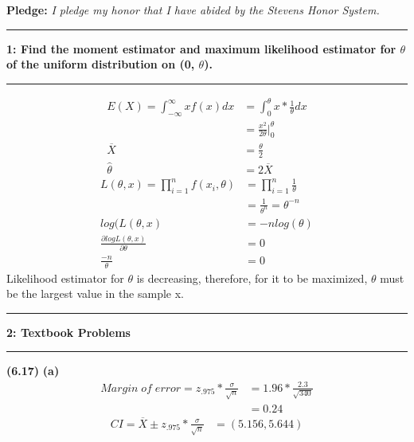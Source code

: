 \documentclass[11pt]{article}
\newcommand\question[2]{\vspace{.25in}\hrule\textbf{#1: #2}\vspace{.5em}\hrule\vspace{.10in}}
\renewcommand\part[1]{\vspace{.10in}\textbf{(#1)}}
\begin{document}
\raggedright


\newcommand\NAME{Eric Altenburg}  %
\newcommand\HWNUM{3}              %



\textbf{Pledge:} \textit{I pledge my honor that I have abided by the Stevens Honor System.}\par

\question{1}{Find the moment estimator and maximum likelihood estimator for $\theta$ of the uniform distribution on (0, $\theta$).} 
	\begin{align*}
		E(X) = \int_{-\infty}^{\infty}xf(x)dx &= \int_{0}^{\theta} x*\frac{1}{\theta}dx\\
		&= \frac{x^{2}}{2\theta} \bigg|_{0}^{\theta}\\
		\overline{X} &= \frac{\theta}{2}\\
		\hat{\theta} &= 2\overline{X}
	\end{align*}
	\begin{align*}
		L(\theta, x) = \prod_{i=1}^{n} f(x_{i}, \theta) &= \prod_{i=1}^{n} \frac{1}{\theta}\\
		&= \frac{1}{\theta^{n}} = \theta^{-n}\\
		log(L(\theta, x) &= -nlog(\theta)\\
		\frac{\partial logL(\theta,x)}{\partial \theta} &= 0\\
		\frac{-n}{\theta} &= 0
	\end{align*}
	Likelihood estimator for $\theta$ is decreasing, therefore, for it to be maximized, $\theta$ must be the largest value in the sample x.
	
	
\question{2}{Textbook Problems}
	\part{6.17}
		\part{a}
			\begin{align*}
				Margin\; of\; error = z_{.975} * \frac{\sigma}{\sqrt{n}} &= 1.96 * \frac{2.3}{\sqrt{340}}\\
				&= 0.24
			\end{align*}
			\begin{align*}
				CI = \overline{X} \pm z_{.975} *  \frac{\sigma}{\sqrt{n}} &= (5.156, 5.644)
			\end{align*}
\end{document}
